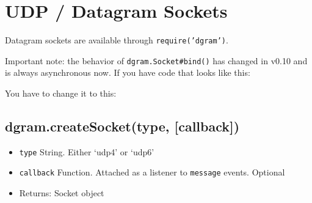 \section{UDP / Datagram Sockets}

\begin{Shaded}
\begin{Highlighting}[]
\NormalTok{: } 
\end{Highlighting}
\end{Shaded}

Datagram sockets are available through \texttt{require('dgram')}.

Important note: the behavior of \texttt{dgram.Socket\#bind()} has
changed in v0.10 and is always asynchronous now. If you have code that
looks like this:

\begin{Shaded}
\begin{Highlighting}[]
 \NormalTok{(}\NormalTok{);}
\NormalTok{(}\NormalTok{);}
\NormalTok{(}\NormalTok{);}
\end{Highlighting}
\end{Shaded}

You have to change it to this:

\begin{Shaded}
\begin{Highlighting}[]
 \NormalTok{(}\NormalTok{);}
\NormalTok{(}\NormalTok{, }\NormalTok{() \{}
  \NormalTok{(}\NormalTok{);}
\NormalTok{\});}
\end{Highlighting}
\end{Shaded}

\subsection{dgram.createSocket(type, {[}callback{]})}

\begin{itemize}
\item
  \texttt{type} String. Either `udp4' or `udp6'
\item
  \texttt{callback} Function. Attached as a listener to \texttt{message}
  events. Optional
\item
  Returns: Socket object
\end{itemize}

